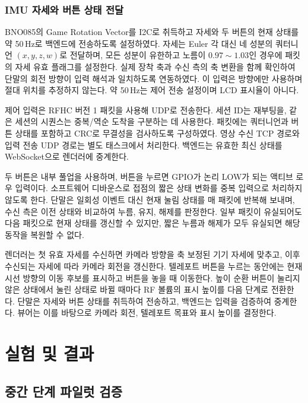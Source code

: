 \documentclass[11pt,a4paper]{article}
\begin{document}
\newpage
\subsubsection{IMU 자세와 버튼 상태 전달}

BNO085의 Game Rotation Vector를 I2C로 취득하고 자세와 두 버튼의 현재 상태를 약 50\,Hz로 백엔드에
전송하도록 설정하였다. 자세는 Euler 각 대신 네 성분의 쿼터니언 $(x,y,z,w)$로 전달하며, 모든 성분이
유한하고 노름이 $0.97\sim1.03$인 경우에 패킷의 자세 유효 플래그를 설정한다. 실제 장착 축과 수신 측의 축 변환을 함께
확인하여 단말의 회전 방향이 입력 해석과 일치하도록 연동하였다. 이 입력은 방향에만 사용하며 절대 위치를
추정하지 않는다. 약 50\,Hz는 제어 전송 설정이며 LCD 표시율이 아니다.

제어 입력은 RFHC 버전 1 패킷을 사용해 UDP로 전송한다. 세션 ID는 재부팅을, 같은 세션의 시퀀스는
중복/역순 도착을 구분하는 데 사용한다. 패킷에는 쿼터니언과 버튼 상태를 포함하고 CRC로 무결성을 검사하도록
구성하였다. 영상 수신 TCP 경로와 입력 전송 UDP 경로는 별도 태스크에서 처리한다. 백엔드는 유효한 최신
상태를 WebSocket으로 렌더러에 중계한다.

두 버튼은 내부 풀업을 사용하며, 버튼을 누르면 GPIO가 논리 LOW가 되는 액티브 로우 입력이다. 소프트웨어 디바운스로
접점의 짧은 상태 변화를 중복 입력으로 처리하지 않도록 한다. 단말은 일회성 이벤트 대신 현재 눌림 상태를
매 패킷에 반복해 보내며, 수신 측은 이전 상태와 비교하여 누름, 유지, 해제를 판정한다. 일부 패킷이 유실되어도
다음 패킷으로 현재 상태를 갱신할 수 있지만, 짧은 누름과 해제가 모두 유실되면 해당 동작을 복원할 수 없다.

렌더러는 첫 유효 자세를 수신하면 카메라 방향을 축 보정된 기기 자세에 맞추고, 이후 수신되는 자세에 따라
카메라 회전을 갱신한다. 텔레포트 버튼을 누르는 동안에는 현재 시선 방향의 이동 후보를 표시하고 버튼을
놓을 때 이동한다. 높이 순환 버튼이 눌리지 않은 상태에서 눌린 상태로 바뀔 때마다 RF 볼륨의 표시 높이를
다음 단계로 전환한다. 단말은 자세와 버튼 상태를
취득하여 전송하고, 백엔드는 입력을 검증하여 중계한다. 뷰어는 이를 바탕으로 카메라 회전, 텔레포트 목표와
표시 높이를 결정한다.

\section{실험 및 결과}
\label{sec:4}

\subsection{중간 단계 파일럿 검증}
\label{sec:4.0}
\end{document}
